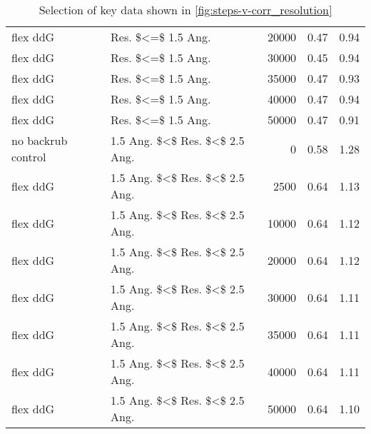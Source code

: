 \begin{table}
\begin{tabular}{llrrr}
           flex ddG &              Res. \$<=\$ 1.5 Ang. &         20000 & 0.47 & 0.94 \\
           flex ddG &              Res. \$<=\$ 1.5 Ang. &         30000 & 0.45 & 0.94 \\
           flex ddG &              Res. \$<=\$ 1.5 Ang. &         35000 & 0.47 & 0.93 \\
           flex ddG &              Res. \$<=\$ 1.5 Ang. &         40000 & 0.47 & 0.94 \\
           flex ddG &              Res. \$<=\$ 1.5 Ang. &         50000 & 0.47 & 0.91 \\
 no backrub control &  1.5 Ang. \$<\$ Res. \$<\$ 2.5 Ang. &             0 & 0.58 & 1.28 \\
           flex ddG &  1.5 Ang. \$<\$ Res. \$<\$ 2.5 Ang. &          2500 & 0.64 & 1.13 \\
           flex ddG &  1.5 Ang. \$<\$ Res. \$<\$ 2.5 Ang. &         10000 & 0.64 & 1.12 \\
           flex ddG &  1.5 Ang. \$<\$ Res. \$<\$ 2.5 Ang. &         20000 & 0.64 & 1.12 \\
           flex ddG &  1.5 Ang. \$<\$ Res. \$<\$ 2.5 Ang. &         30000 & 0.64 & 1.11 \\
           flex ddG &  1.5 Ang. \$<\$ Res. \$<\$ 2.5 Ang. &         35000 & 0.64 & 1.11 \\
           flex ddG &  1.5 Ang. \$<\$ Res. \$<\$ 2.5 Ang. &         40000 & 0.64 & 1.11 \\
           flex ddG &  1.5 Ang. \$<\$ Res. \$<\$ 2.5 Ang. &         50000 & 0.64 & 1.10 \\
\bottomrule
\end{tabular}

\caption[]{Selection of key data shown in \cref{fig:steps-v-corr_resolution}}
\label{tab:steps-v-corr_resolution-underlying-data}
\end{table}
